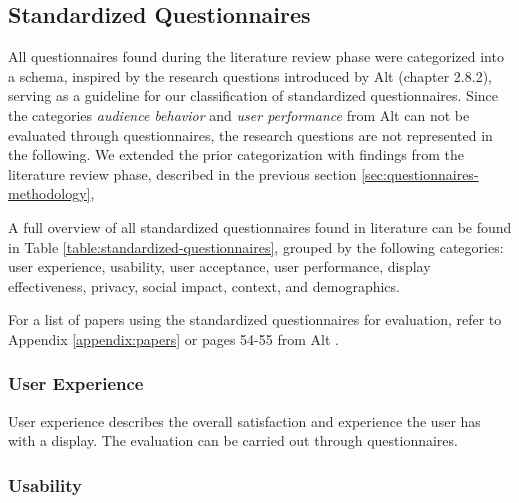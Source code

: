 




\subsection{Standardized Questionnaires}
\label{sec:questionnaires-categorization}



	All questionnaires found during the literature review phase were categorized into a schema, inspired by the research questions introduced by Alt \cite{alt2013thesis} (chapter 2.8.2), serving as a guideline for our classification of standardized questionnaires. Since the categories \textit{audience behavior} and \textit{user performance} from Alt can not be evaluated through questionnaires, the research questions are not represented in the following.
	We extended the prior categorization with findings from the literature review phase, described in the previous section \ref{sec:questionnaires-methodology}, 

	A full overview of all standardized questionnaires found in literature can be found in Table \ref{table:standardized-questionnaires}, grouped by the following categories: user experience, usability, user acceptance, user performance, display effectiveness, privacy, social impact, context, and demographics.

	For a list of papers using the standardized questionnaires for evaluation, refer to Appendix \ref{appendix:papers} or pages 54-55 from Alt \cite{alt2013thesis}.



	\subsubsection{User Experience}

		User experience describes the overall satisfaction and experience the user has with a display. The evaluation can be carried out through questionnaires.
	
	\subsubsection{Usability}

